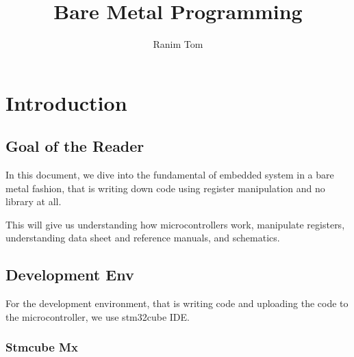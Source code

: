 \documentclass[12pt,a4paper]{book}
\title{Bare Metal Programming}
\author{Ranim Tom}
\begin{document}
% 







\maketitle

\tableofcontents



\printnomenclature




\listoftodos


\pagestyle{fancy}
\fancyhf{} %
\rhead{\rightmark}




\chapter{Introduction}

\section{Goal of the Reader}

In this document, we dive into the fundamental of embedded system in a bare metal fashion, that is writing down code using register manipulation and no library at all. 

This will give us understanding how microcontrollers work, manipulate registers, understanding data sheet and reference manuals, and schematics.

\section{Development Env}

For the development environment, that is writing code and uploading the code to the microcontroller, we use stm32cube IDE.

\subsection{Stmcube Mx}
\end{document}
